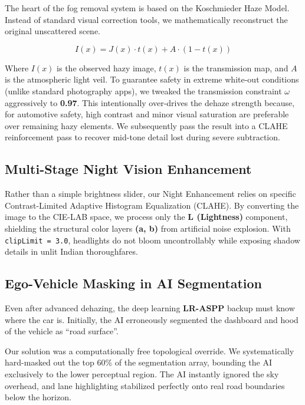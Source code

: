 \documentclass[12pt, a4paper]{article}
\begin{document}
The heart of the fog removal system is based on the Koschmieder Haze Model. 
Instead of standard visual correction tools, we mathematically reconstruct the original unscattered scene. 

\begin{equation}
  I(x) = J(x) \cdot t(x) + A \cdot (1 - t(x))
  \label{eq:haze}
\end{equation}

Where $I(x)$ is the observed hazy image, $t(x)$ is the transmission map, and $A$ is the atmospheric light veil. 
To guarantee safety in extreme white-out conditions (unlike standard photography apps), we tweaked the transmission constraint $\omega$ aggressively to \textbf{0.97}. This intentionally over-drives the dehaze strength because, for automotive safety, high contrast and minor visual saturation are preferable over remaining hazy elements. We subsequently pass the result into a CLAHE reinforcement pass to recover mid-tone detail lost during severe subtraction.

\subsection{Multi-Stage Night Vision Enhancement}

Rather than a simple brightness slider, our Night Enhancement relies on specific Contrast-Limited Adaptive Histogram Equalization (CLAHE). By converting the image to the CIE-LAB space, we process only the \textbf{L (Lightness)} component, shielding the structural color layers \textbf{(a, b)} from artificial noise explosion. With \texttt{clipLimit = 3.0}, headlights do not bloom uncontrollably while exposing shadow details in unlit Indian thoroughfares.

\subsection{Ego-Vehicle Masking in AI Segmentation}

Even after advanced dehazing, the deep learning \textbf{LR-ASPP} backup must know where the car is. Initially, the AI erroneously segmented the dashboard and hood of the vehicle as ``road surface''. 

Our solution was a computationally free topological override. We systematically hard-masked out the top 60\% of the segmentation array, bounding the AI exclusively to the lower perceptual region. The AI instantly ignored the sky overhead, and lane highlighting stabilized perfectly onto real road boundaries below the horizon.
\end{document}
